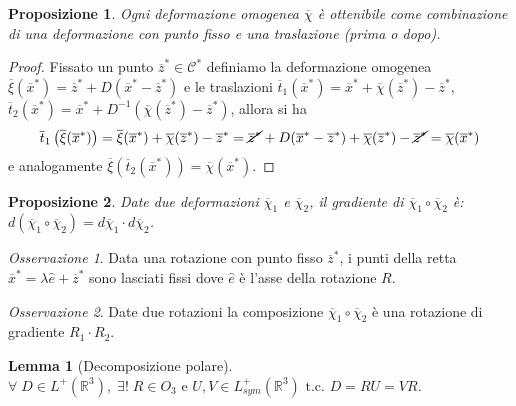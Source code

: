 \documentclass{book}
\theoremstyle{plain}
\theoremstyle{plain}
\newtheorem*{lemma}{Lemma}
\theoremstyle{plain}
\theoremstyle{plain}
\theoremstyle{plain}
\newtheorem{prop}{Proposizione}[chapter]
\theoremstyle{definition}
\theoremstyle{remark}
\newtheorem*{oss}{Osservazione}
\theoremstyle{definition}
\begin{document}
\begin{prop}
    Ogni deformazione omogenea $\overline{\chi}$ è ottenibile come combinazione di una deformazione con punto fisso e una traslazione (prima o dopo).
\end{prop}

\begin{proof}
    Fissato un punto $\overline{z}^*\in\mathcal{C}^*$ definiamo la deformazione omogenea $\overline{\xi}(\overline{x}^*)=\overline{z}^*+D(\overline{x}^*-\overline{z}^*)$ e le traslazioni $\overline{t}_1(\overline{x}^*)=\overline{x}^*+\overline{\chi}(\overline{z}^*)-\overline{z}^*$, $\overline{t}_2(\overline{x}^*)=\overline{x}^*+D^{-1}(\overline{\chi}(\overline{z}^*)-\overline{z}^*)$, allora si ha
    \begin{displaymath}
        \overline{t}_1\left(\overline{\xi}(\overline{x}^*)\right)=\overline{\xi}(\overline{x}^*)+\overline{\chi}(\overline{z}^*)-\overline{z}^*=\cancel{\overline{z}^*}+D(\overline{x}^*-\overline{z}^*)+\overline{\chi}(\overline{z}^*)-\cancel{\overline{z}^*}=\overline{\chi}(\overline{x}^*)
    \end{displaymath}
    e analogamente $\overline{\xi}\left(\overline{t}_2(\overline{x}^*)\right)=\overline{\chi}(\overline{x}^*)$.
\end{proof}

\begin{prop}
    Date due deformazioni $\overline{\chi}_1$ e $\overline{\chi}_2$, il gradiente di $\overline{\chi}_1\circ\overline{\chi}_2$ è: $d(\overline{\chi}_1\circ\overline{\chi}_2)=d\overline{\chi}_1\cdot d\overline{\chi}_2$.
\end{prop}

\begin{oss}
    Data una rotazione con punto fisso $\overline{z}^*$, i punti della retta $\overline{x}^*=\lambda\hat{e}+\overline{z}^*$ sono lasciati fissi dove $\hat{e}$ è l'asse della rotazione $R$.
\end{oss}

\begin{oss}
    Date due rotazioni la composizione $\overline{\chi}_1\circ\overline{\chi}_2$ è una rotazione di gradiente $R_1\cdot R_2$.
\end{oss}

\begin{lemma}[Decomposizione polare]
    $\forall \;D\in L^+(\mathbb{R}^3),\; \exists!\; R \in O_3 \text{ e } U,V\in L_{sym}^+(\mathbb{R}^3) \text{ t.c. }D=RU=VR$.
\end{lemma}
\end{document}
